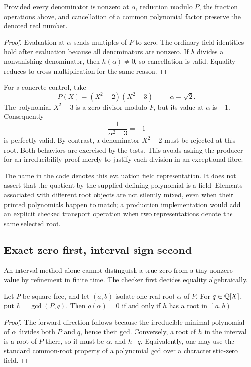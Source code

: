 \begin{proposition}
Provided every denominator is nonzero at $\alpha$, reduction modulo $P$, the fraction operations above, and cancellation of a common polynomial factor preserve the denoted real number.
\end{proposition}
\begin{proof}
Evaluation at $\alpha$ sends multiples of $P$ to zero. The ordinary field identities hold after evaluation because all denominators are nonzero. If $h$ divides a nonvanishing denominator, then $h(\alpha)\ne0$, so cancellation is valid. Equality reduces to cross multiplication for the same reason.
\end{proof}

For a concrete control, take
\[
 P(X)=(X^2-2)(X^2-3),\qquad \alpha=\sqrt2.
\]
The polynomial $X^2-3$ is a zero divisor modulo $P$, but its value at $\alpha$ is $-1$. Consequently
\[
 \frac1{\alpha^2-3}=-1
\]
is perfectly valid. By contrast, a denominator $X^2-2$ must be rejected at this root. Both behaviors are exercised by the tests. This avoids asking the producer for an irreducibility proof merely to justify each division in an exceptional fibre.

The name  in the code denotes this evaluation field representation. It does not assert that the quotient by the supplied defining polynomial is a field. Elements associated with different root objects are not silently mixed, even when their printed polynomials happen to match; a production implementation would add an explicit checked transport operation when two representations denote the same selected root.

\subsection{Exact zero first, interval sign second}
An interval method alone cannot distinguish a true zero from a tiny nonzero value by refinement in finite time. The checker first decides equality algebraically.

\begin{lemma}\label{lem:gcd-zero}
Let $P$ be square-free, and let $(a,b)$ isolate one real root $\alpha$ of $P$. For $q\in\mathbb Q[X]$, put $h=\gcd(P,q)$. Then $q(\alpha)=0$ if and only if $h$ has a root in $(a,b)$.
\end{lemma}
\begin{proof}
The forward direction follows because the irreducible minimal polynomial of $\alpha$ divides both $P$ and $q$, hence their gcd. Conversely, a root of $h$ in the interval is a root of $P$ there, so it must be $\alpha$, and $h\mid q$. Equivalently, one may use the standard common-root property of a polynomial gcd over a characteristic-zero field.
\end{proof}

